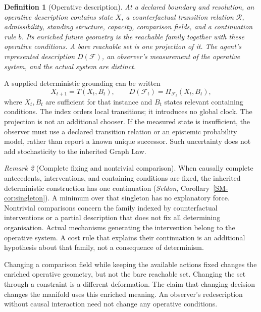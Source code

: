 \documentclass[11pt,a4paper]{article}
\newtheorem{definition}{Definition}[section]
\theoremstyle{remark}
\newtheorem{remark}[definition]{Remark}
\newcommand{\Frame}{\mathcal F}
\begin{document}
\begin{definition}[Operative description]\label{def:operative}
At a declared boundary and resolution, an operative description contains state
\(X\), a counterfactual transition relation \(\mathcal R\), admissibility,
standing structure, capacity, comparison fields, and a continuation rule
\(b\). Its enriched future geometry is the reachable family together with
these operative conditions. A bare reachable set is one projection of it.
The agent's represented description \(D(\Frame)\), an observer's measurement
of the operative system, and the actual system are distinct.
\end{definition}

A supplied deterministic grounding can be written
\[
X_{t+1}=T(X_t,B_t),\qquad
D(\Frame_t)=\Pi_{\Frame_t}(X_t,B_t),
\]
where \(X_t,B_t\) are sufficient for that instance and \(B_t\) states relevant
containing conditions. The index orders local transitions; it introduces no
global clock. The projection is not an additional chooser. If the measured
state is insufficient, the observer must use a declared transition relation
or an epistemic probability model, rather than report a known unique
successor. Such uncertainty does not add stochasticity to the inherited
Graph Law.

\begin{remark}[Complete fixing and nontrivial comparison]\label{rem:singleton}
When causally complete antecedents, interventions, and containing conditions
are fixed, the inherited deterministic construction has one continuation
(\emph{Seldon}, Corollary~\ref{SM-cor:singleton}). A minimum over that singleton
has no explanatory force. Nontrivial comparisons concern the family indexed
by counterfactual interventions or a partial description that does not fix
all determining organisation. Actual mechanisms generating the intervention
belong to the operative system. A cost rule that explains their continuation
is an additional hypothesis about that family, not a consequence of
determinism.
\end{remark}

Changing a comparison field while keeping the available actions fixed changes
the enriched operative geometry, but not the bare reachable set. Changing
the set through a constraint is a different deformation. The claim that
changing decision changes the manifold uses this enriched meaning. An
observer's redescription without causal interaction need not change any
operative conditions.
\end{document}
